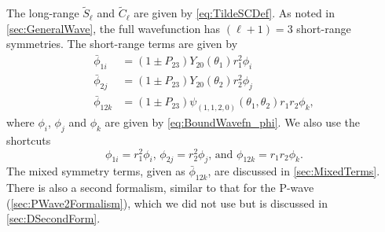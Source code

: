 \documentclass[Dissertation.tex]{subfiles}
\begin{document}
%
%
The long-range $\widetilde{S}_\ell$ and $\widetilde{C}_\ell$ are given by
\cref{eq:TildeSCDef}.
As noted in \cref{sec:GeneralWave}, the full wavefunction has $(\ell+1) = 3$
short-range symmetries. The short-range terms are given by
\begin{subequations}
\label{eq:DWavePhiBar}
\begin{align}
\bar{\phi}_{1i} &= \left(1 \pm P_{23}\right) Y_{20}(\theta_1) r_1^2 \phi_i \label{eq:DWavePhi1i}\\
\bar{\phi}_{2j} &= \left(1 \pm P_{23}\right) Y_{20}(\theta_2) r_2^2 \phi_j \label{eq:DWavePhi2j}\\
\bar{\phi}_{12k} &= \left(1 \pm P_{23}\right) \psi_{(1,1,2,0)}(\theta_1,\theta_2) r_1 r_2 \phi_k, \label{eq:DWavePhi12k}
\end{align}
\end{subequations}
where $\phi_i$, $\phi_j$ and $\phi_k$ are given by \cref{eq:BoundWavefn_phi}.
We also use the shortcuts
\begin{equation}
\label{eq:DWavePhi}
\phi_{1i} = r_1^2 \phi_i \text{, }
\phi_{2j} = r_2^2 \phi_j \text{, and }
\phi_{12k} = r_1 r_2 \phi_k.
\end{equation}
The mixed symmetry terms, given as $\bar{\phi}_{12k}$,
are discussed in \cref{sec:MixedTerms}. There is also a second formalism,
similar to that for the P-wave (\cref{sec:PWave2Formalism}), which we did not
use but is discussed in \cref{sec:DSecondForm}.
\end{document}
